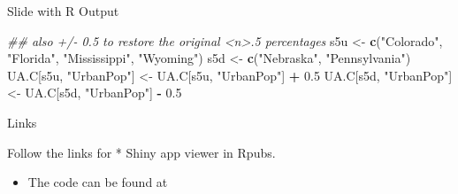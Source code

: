 \documentclass[
  ignorenonframetext,
]{beamer}
\newenvironment{Shaded}{\begin{snugshade}}{\end{snugshade}}
\newcommand{\CommentTok}[1]{\textcolor[rgb]{0.56,0.35,0.01}{\textit{#1}}}
\newcommand{\FloatTok}[1]{\textcolor[rgb]{0.00,0.00,0.81}{#1}}
\newcommand{\KeywordTok}[1]{\textcolor[rgb]{0.13,0.29,0.53}{\textbf{#1}}}
\newcommand{\NormalTok}[1]{#1}
\newcommand{\OperatorTok}[1]{\textcolor[rgb]{0.81,0.36,0.00}{\textbf{#1}}}
\newcommand{\StringTok}[1]{\textcolor[rgb]{0.31,0.60,0.02}{#1}}
\providecommand{\tightlist}{%
  \setlength{\itemsep}{0pt}\setlength{\parskip}{0pt}}
\begin{document}
\begin{frame}[fragile]{Slide with R Output}
\begin{Shaded}
\begin{Highlighting}[]
\CommentTok{## also +/- 0.5 to restore the original  <n>.5  percentages}
\NormalTok{s5u <-}\StringTok{ }\KeywordTok{c}\NormalTok{(}\StringTok{"Colorado"}\NormalTok{, }\StringTok{"Florida"}\NormalTok{, }\StringTok{"Mississippi"}\NormalTok{, }\StringTok{"Wyoming"}\NormalTok{)}
\NormalTok{s5d <-}\StringTok{ }\KeywordTok{c}\NormalTok{(}\StringTok{"Nebraska"}\NormalTok{, }\StringTok{"Pennsylvania"}\NormalTok{)}
\NormalTok{UA.C[s5u, }\StringTok{"UrbanPop"}\NormalTok{] <-}\StringTok{ }\NormalTok{UA.C[s5u, }\StringTok{"UrbanPop"}\NormalTok{] }\OperatorTok{+}\StringTok{ }\FloatTok{0.5}
\NormalTok{UA.C[s5d, }\StringTok{"UrbanPop"}\NormalTok{] <-}\StringTok{ }\NormalTok{UA.C[s5d, }\StringTok{"UrbanPop"}\NormalTok{] }\OperatorTok{-}\StringTok{ }\FloatTok{0.5}
\end{Highlighting}
\end{Shaded}

\end{frame}

\begin{frame}{Links}
\protect\hypertarget{links}{}

Follow the links for * Shiny app viewer in Rpubs.

\begin{itemize}
\tightlist
\item
  The code can be found at
\end{itemize}

\end{frame}
\end{document}
